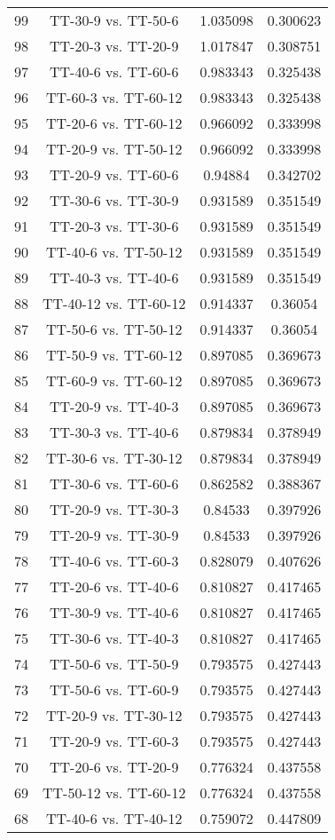 \documentclass[a4paper,10pt]{article}
\begin{document}
\begin{landscape}
\begin{table}[!htp]
\begin{tabular}{cccc}
99&TT-30-9 vs. TT-50-6&1.035098&0.300623\\
98&TT-20-3 vs. TT-20-9&1.017847&0.308751\\
97&TT-40-6 vs. TT-60-6&0.983343&0.325438\\
96&TT-60-3 vs. TT-60-12&0.983343&0.325438\\
95&TT-20-6 vs. TT-60-12&0.966092&0.333998\\
94&TT-20-9 vs. TT-50-12&0.966092&0.333998\\
93&TT-20-9 vs. TT-60-6&0.94884&0.342702\\
92&TT-30-6 vs. TT-30-9&0.931589&0.351549\\
91&TT-20-3 vs. TT-30-6&0.931589&0.351549\\
90&TT-40-6 vs. TT-50-12&0.931589&0.351549\\
89&TT-40-3 vs. TT-40-6&0.931589&0.351549\\
88&TT-40-12 vs. TT-60-12&0.914337&0.36054\\
87&TT-50-6 vs. TT-50-12&0.914337&0.36054\\
86&TT-50-9 vs. TT-60-12&0.897085&0.369673\\
85&TT-60-9 vs. TT-60-12&0.897085&0.369673\\
84&TT-20-9 vs. TT-40-3&0.897085&0.369673\\
83&TT-30-3 vs. TT-40-6&0.879834&0.378949\\
82&TT-30-6 vs. TT-30-12&0.879834&0.378949\\
81&TT-30-6 vs. TT-60-6&0.862582&0.388367\\
80&TT-20-9 vs. TT-30-3&0.84533&0.397926\\
79&TT-20-9 vs. TT-30-9&0.84533&0.397926\\
78&TT-40-6 vs. TT-60-3&0.828079&0.407626\\
77&TT-20-6 vs. TT-40-6&0.810827&0.417465\\
76&TT-30-9 vs. TT-40-6&0.810827&0.417465\\
75&TT-30-6 vs. TT-40-3&0.810827&0.417465\\
74&TT-50-6 vs. TT-50-9&0.793575&0.427443\\
73&TT-50-6 vs. TT-60-9&0.793575&0.427443\\
72&TT-20-9 vs. TT-30-12&0.793575&0.427443\\
71&TT-20-9 vs. TT-60-3&0.793575&0.427443\\
70&TT-20-6 vs. TT-20-9&0.776324&0.437558\\
69&TT-50-12 vs. TT-60-12&0.776324&0.437558\\
68&TT-40-6 vs. TT-40-12&0.759072&0.447809\\

\end{tabular}
\end{table}
\end{landscape}
\end{document}
